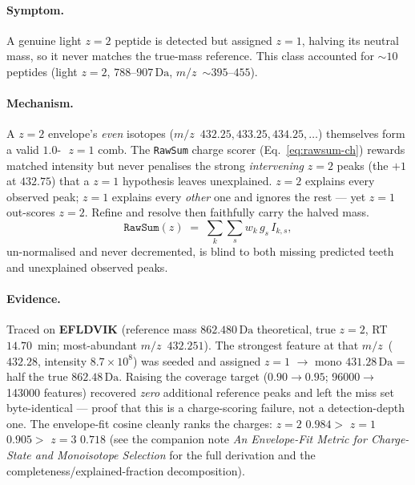 \documentclass[11pt]{article}
\newcommand{\Da}{\,\text{Da}}
\newcommand{\Th}{\,\text{Th}}
\newcommand{\mz}{\ensuremath{m/z}}
\newcommand{\zeq}[1]{\ensuremath{z{=}#1}}
\begin{document}
\paragraph{Symptom.} A genuine light \zeq{2} peptide is detected but assigned \zeq{1}, halving its
neutral mass, so it never matches the true-mass reference. This class accounted for $\sim 10$
peptides (light \zeq{2}, $788$--$907\Da$, \mz\ $\sim 395$--$455$).

\paragraph{Mechanism.} A \zeq{2} envelope's \emph{even} isotopes (\mz\ $432.25, 433.25, 434.25,
\ldots$) themselves form a valid $1.0$-\Th\ \zeq{1} comb. The \texttt{RawSum} charge scorer
(Eq.~\ref{eq:rawsum-ch}) rewards matched intensity but never penalises the strong \emph{intervening}
\zeq{2} peaks (the $+1$ at $432.75$) that a \zeq{1} hypothesis leaves unexplained. \zeq{2} explains
every observed peak; \zeq{1} explains every \emph{other} one and ignores the rest --- yet \zeq{1}
out-scores \zeq{2}. Refine and resolve then faithfully carry the halved mass.
\begin{equation}
\texttt{RawSum}(z) \;=\; \sum_{k}\sum_{s} w_k\, g_s\, I_{k,s},
\label{eq:rawsum-ch}
\end{equation}
un-normalised and never decremented, is blind to both missing predicted teeth and unexplained
observed peaks.

\paragraph{Evidence.} Traced on \textbf{EFLDVIK} (reference mass $862.480\Da$ theoretical, true
\zeq{2}, RT $14.70$~min; most-abundant \mz\ $432.251$). The strongest feature at that \mz\
($432.28$, intensity $8.7\times10^{8}$) was seeded and assigned \zeq{1} $\rightarrow$ mono
$431.28\Da$ = half the true $862.48\Da$. Raising the coverage target ($0.90\rightarrow 0.95$;
\num{96000}$\rightarrow$\num{143000} features) recovered \emph{zero} additional reference peaks and
left the miss set byte-identical --- proof that this is a charge-scoring failure, not a detection-depth
one. The envelope-fit cosine cleanly ranks the charges: \zeq{2} $0.984 >$ \zeq{1} $0.905 >$ \zeq{3}
$0.718$ (see the companion note \emph{An Envelope-Fit Metric for Charge-State and Monoisotope
Selection} for the full derivation and the completeness/explained-fraction decomposition).
\end{document}
